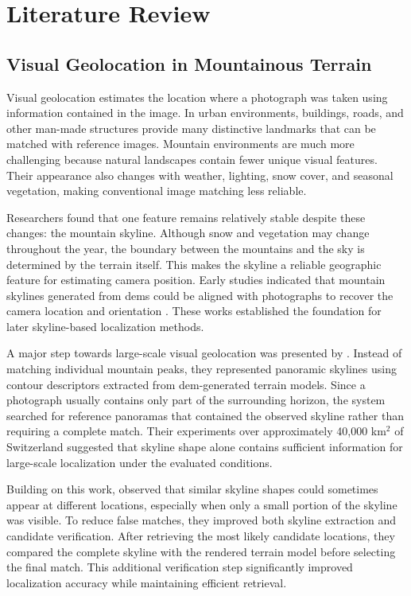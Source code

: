 \chapter{Literature Review}

\section{Visual Geolocation in Mountainous Terrain}

Visual geolocation estimates the location where a photograph was taken using information contained in the image. In urban environments, buildings, roads, and other man-made structures provide many distinctive landmarks that can be matched with reference images. Mountain environments are much more challenging because natural landscapes contain fewer unique visual features. Their appearance also changes with weather, lighting, snow cover, and seasonal vegetation, making conventional image matching less reliable.

Researchers found that one feature remains relatively stable despite these changes: the mountain skyline. Although snow and vegetation may change throughout the year, the boundary between the mountains and the sky is determined by the terrain itself. This makes the skyline a reliable geographic feature for estimating camera position. Early studies indicated that mountain skylines generated from \Glspl{dem} could be aligned with photographs to recover the camera location and orientation \cite{naval1997,naval1998camera}. These works established the foundation for later skyline-based localization methods.

A major step towards large-scale visual geolocation was presented by \cite{baatz2012}. Instead of matching individual mountain peaks, they represented panoramic skylines using contour descriptors extracted from \Gls{dem}-generated terrain models. Since a photograph usually contains only part of the surrounding horizon, the system searched for reference panoramas that contained the observed skyline rather than requiring a complete match. Their experiments over approximately 40,000 km$^2$ of Switzerland suggested that skyline shape alone contains sufficient information for large-scale localization under the evaluated conditions.

Building on this work, \cite{saurer2016image} observed that similar skyline shapes could sometimes appear at different locations, especially when only a small portion of the skyline was visible. To reduce false matches, they improved both skyline extraction and candidate verification. After retrieving the most likely candidate locations, they compared the complete skyline with the rendered terrain model before selecting the final match. This additional verification step significantly improved localization accuracy while maintaining efficient retrieval.

